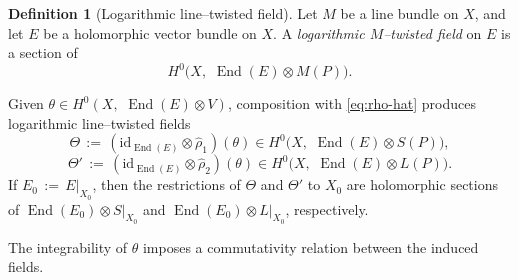\documentclass[a4paper,12pt]{amsart}
\numberwithin{equation}{section}
\theoremstyle{definition}
\newtheorem{definition}[theorem]{Definition}
\newcommand{\End}{\operatorname{End}}
\newcommand{\id}{\mathrm{id}}
\begin{document}
\begin{definition}[Logarithmic line--twisted field]
Let \(M\) be a line bundle on \(X\), and let \(E\) be a holomorphic vector bundle on \(X\).  A \emph{logarithmic \(M\)--twisted field} on \(E\) is a section of
\[
H^0\bigl(X,\,\, \End(E)\otimes M(P)\bigr).
\]
\end{definition}

Given \(\theta\in H^0(X,\,\, \End(E)\otimes V)\), composition with \eqref{eq:rho-hat} produces logarithmic line--twisted fields
\begin{equation}\label{eq:ThetaTheta}
\Theta\,:=\,(\id_{\End(E)}\otimes \widehat{\rho}_1)(\theta)\in H^0\bigl(X,\,\, \End(E)\otimes S(P)\bigr),
\end{equation}
\begin{equation}\label{eq:ThetaPrime}
\Theta'\,:=\,(\id_{\End(E)}\otimes \widehat{\rho}_2)(\theta)\in H^0\bigl(X,\,\, \End(E)\otimes L(P)\bigr).
\end{equation}
If \(E_0\,:=\,E|_{X_0}\), then the restrictions of \(\Theta\) and \(\Theta'\) to \(X_0\) are holomorphic sections of \(\End(E_0)\otimes S|_{X_0}\) and \(\End(E_0)\otimes L|_{X_0}\), respectively.

The integrability of \(\theta\) imposes a commutativity relation between the induced fields.
\end{document}
